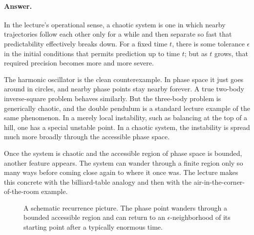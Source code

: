 \paragraph{Answer.} In the lecture's operational sense, a chaotic system is one in which nearby trajectories follow each other only for a while and then separate so fast that predictability effectively breaks down. For a fixed time \(t\), there is some tolerance \(\epsilon\) in the initial conditions that permits prediction up to time \(t\); but as \(t\) grows, that required precision becomes more and more severe.

The harmonic oscillator is the clean counterexample. In phase space it just goes around in circles, and nearby phase points stay nearby forever. A true two-body inverse-square problem behaves similarly. But the three-body problem is generically chaotic, and the double pendulum is a standard lecture example of the same phenomenon. In a merely local instability, such as balancing at the top of a hill, one has a special unstable point. In a chaotic system, the instability is spread much more broadly through the accessible phase space.

Once the system is chaotic and the accessible region of phase space is bounded, another feature appears. The system can wander through a finite region only so many ways before coming close again to where it once was. The lecture makes this concrete with the billiard-table analogy and then with the air-in-the-corner-of-the-room example.

\begin{figure}[h]
\centering
{}
\caption{A schematic recurrence picture. The phase point wanders through a bounded accessible region and can return to an \(\epsilon\)-neighborhood of its starting point after a typically enormous time.}
\end{figure}

